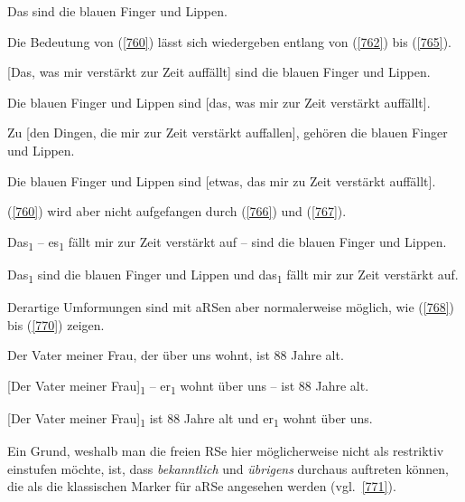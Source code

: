 \begin{exe}
	\ex\label{761} 
	Das sind die blauen Finger und Lippen.
\end{exe} 
Die Bedeutung von (\ref{760}) lässt sich wiedergeben entlang von (\ref{762}) bis (\ref{765}).

\begin{exe}
	\ex\label{762} 
	[Das, was mir verstärkt zur Zeit auffällt] sind die blauen Finger und Lippen.		
\end{exe}

\begin{exe}
	\ex\label{763} 
	Die blauen Finger und Lippen sind [das, was mir zur Zeit verstärkt auffällt].		
\end{exe}

\begin{exe}
	\ex\label{764} 
	Zu [den Dingen, die mir zur Zeit verstärkt auffallen], gehören die blauen Finger und Lippen.		
\end{exe}	

\begin{exe}
	\ex\label{765} 
	Die blauen Finger und Lippen sind [etwas, das mir zu Zeit verstärkt auffällt].		
\end{exe}	
(\ref{760}) wird aber nicht aufgefangen durch (\ref{766}) und (\ref{767}).

\begin{exe}
	\ex\label{766} 
	Das\textsubscript{1} – es\textsubscript{1} fällt mir zur Zeit verstärkt auf – sind die blauen Finger und Lippen.		
\end{exe}

\begin{exe}
	\ex\label{767} 
	Das\textsubscript{1} sind die blauen Finger und Lippen und das\textsubscript{1} fällt mir zur Zeit verstärkt auf.		
\end{exe}
Derartige Umformungen sind mit aRSen aber normalerweise möglich, wie (\ref{768}) bis (\ref{770}) zeigen.

\begin{exe}
	\ex\label{768} 
	Der Vater meiner Frau, der über uns wohnt, ist 88 Jahre alt.		
\end{exe}

\begin{exe}
	\ex\label{769} 
	[Der Vater meiner Frau]\textsubscript{1} – er\textsubscript{1} wohnt über uns – ist 88 Jahre alt.		
\end{exe}	

\begin{exe}
	\ex\label{770} 
	[Der Vater meiner Frau]\textsubscript{1} ist 88 Jahre alt und er\textsubscript{1} wohnt über uns.	
\end{exe}
Ein Grund, weshalb man die freien RSe hier möglicherweise nicht als restriktiv einstufen möchte, ist, dass \textit{bekanntlich} und \textit{übrigens} durchaus auftreten können, die als die klassischen Marker für aRSe angesehen werden (vgl.\ \ref{771}).

